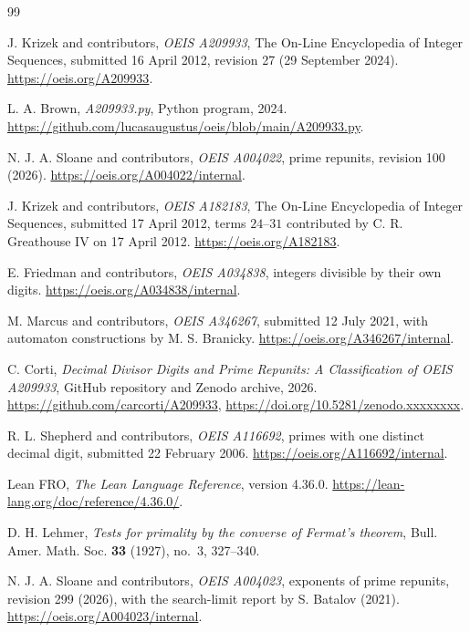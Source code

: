 \documentclass[11pt]{article}
\begin{document}
\clearpage
\begin{thebibliography}{99}
\raggedright\sloppy

J. Krizek and contributors, \emph{OEIS A209933}, The On-Line
Encyclopedia of Integer Sequences, submitted 16 April 2012, revision 27
(29 September 2024). \url{https://oeis.org/A209933}.

L. A. Brown, \emph{A209933.py}, Python program, 2024.
\url{https://github.com/lucasaugustus/oeis/blob/main/A209933.py}.

N. J. A. Sloane and contributors, \emph{OEIS A004022}, prime repunits,
revision 100 (2026). \url{https://oeis.org/A004022/internal}.

J. Krizek and contributors, \emph{OEIS A182183}, The On-Line
Encyclopedia of Integer Sequences, submitted 17 April 2012, terms
\(24\)--\(31\) contributed by C. R. Greathouse IV on 17 April 2012.
\url{https://oeis.org/A182183}.

E. Friedman and contributors, \emph{OEIS A034838}, integers divisible
by their own digits. \url{https://oeis.org/A034838/internal}.

M. Marcus and contributors, \emph{OEIS A346267}, submitted 12 July
2021, with automaton constructions by M. S. Branicky.
\url{https://oeis.org/A346267/internal}.

C. Corti, \emph{Decimal Divisor Digits and Prime Repunits: A
Classification of OEIS A209933}, GitHub repository and Zenodo archive,
2026. \url{https://github.com/carcorti/A209933},
\url{https://doi.org/10.5281/zenodo.xxxxxxxx}.

R. L. Shepherd and contributors, \emph{OEIS A116692}, primes with
one distinct decimal digit, submitted 22 February 2006.
\url{https://oeis.org/A116692/internal}.

Lean FRO, \emph{The Lean Language Reference}, version 4.36.0.
\url{https://lean-lang.org/doc/reference/4.36.0/}.

D. H. Lehmer, \emph{Tests for primality by the converse of Fermat's
theorem}, Bull. Amer. Math. Soc. \textbf{33} (1927), no.~3, 327--340.

N. J. A. Sloane and contributors, \emph{OEIS A004023}, exponents of
prime repunits, revision 299 (2026), with the search-limit report
by S. Batalov (2021). \url{https://oeis.org/A004023/internal}.


\end{thebibliography}
\end{document}
